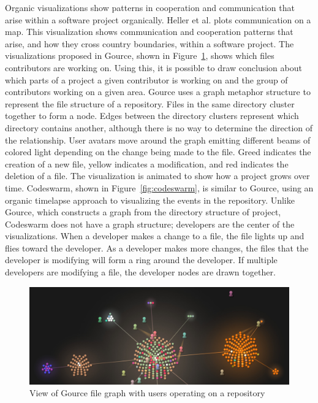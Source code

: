 Organic visualizations show patterns in cooperation and communication
that arise within a software project organically. Heller et
al.\cite{Heller2011} plots communication on a map. This visualization
shows communication and cooperation patterns that arise, and how they
cross country boundaries, within a software project. The visualizations
proposed in Gource\cite{Caudwell2010}, shown in
Figure~\ref{fig:gource_view}, shows which files contributors are working
on. Using this, it is possible to draw conclusion about which parts of a
project a given contributor is working on and the group of contributors
working on a given area. Gource uses a graph metaphor structure to
represent the file structure of a repository. Files in the same
directory cluster together to form a node. Edges between the directory
clusters represent which directory contains another, although there is
no way to determine the direction of the relationship. User avatars move
around the graph emitting different beams of colored light depending on
the change being made to the file. Greed indicates the creation of a new
file, yellow indicates a modification, and red indicates the deletion of
a file. The visualization is animated to show how a project grows over
time. Codeswarm\cite{ogawa09}, shown in Figure~\ref{fig:codeswarm}, is
similar to Gource, using an organic timelapse approach to visualizing
the events in the repository. Unlike Gource, which constructs a graph
from the directory structure of project, Codeswarm does not have a graph
structure; developers are the center of the visualizations. When a
developer makes a change to a file, the file lights up and flies toward
the developer. As a developer makes more changes, the files that the
developer is modifying will form a ring around the developer. If
multiple developers are modifying a file, the developer nodes are drawn
together.

\begin{figure}[htpb]
  \centering
  \includegraphics[width=0.8\linewidth]{./Figures/introduction/gource-linux.jpg}
  \caption{View of Gource file graph with users operating on a
    repository}
  \label{fig:gource_view}
\end{figure}

